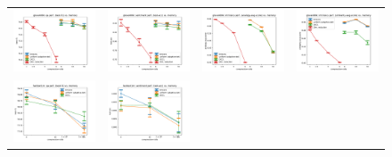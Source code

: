 \begin{figure}
	\centering
	\begin{tabular}{@{\hskip -0.0in}c@{\hskip -0.0in}c@{\hskip -0.0in}c@{\hskip -0.0in}c@{\hskip -0.0in}}
		\includegraphics[width=.245\linewidth]{figures/glove400k_qa_best-f1_vs_compression.pdf} &
		\includegraphics[width=.245\linewidth]{figures/glove400k_sentiment_sst_test-acc_vs_compression.pdf} &
		\includegraphics[width=.245\linewidth]{figures/glove400k_intrinsics_analogy-avg-score_vs_compression.pdf} &
		\includegraphics[width=.245\linewidth]{figures/glove400k_intrinsics_similarity-avg-score_vs_compression.pdf} \\
		\includegraphics[width=.245\linewidth]{figures/fasttext1m_qa_best-f1_vs_compression.pdf} &
		\includegraphics[width=.245\linewidth]{figures/fasttext1m_sentiment_sst_test-acc_vs_compression.pdf} &

\end{tabular}
\end{figure}
